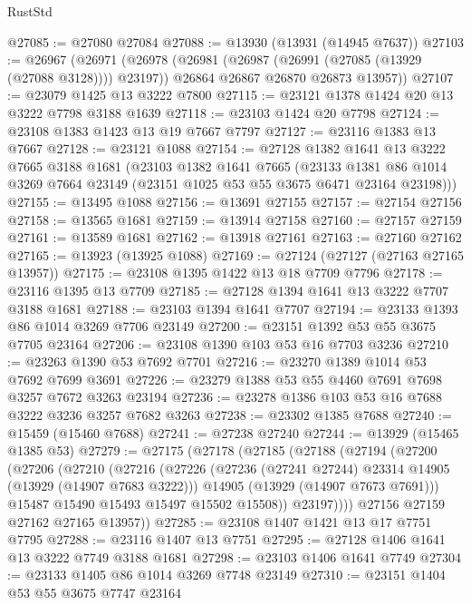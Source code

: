 \begin{lexlean}{RustStd}
\begin{coremodule}
@27085 := @27080 @27084
@27088 := @13930 (@13931 (@14945 @7637))
@27103 := @26967
    (@26971
      (@26978
        (@26981 (@26987 (@26991 (@27085 (@13929 (@27088 @3128)))) @23197))
        @26864
        @26867
        @26870
        @26873
        @13957))
@27107 := @23079 @1425 @13 @3222 @7800
@27115 := @23121 @1378 @1424 @20 @13 @3222 @7798 @3188 @1639
@27118 := @23103 @1424 @20 @7798
@27124 := @23108 @1383 @1423 @13 @19 @7667 @7797
@27127 := @23116 @1383 @13 @7667
@27128 := @23121 @1088
@27154 := @27128
    @1382
    @1641
    @13
    @3222
    @7665
    @3188
    @1681
    (@23103
      @1382
      @1641
      @7665
      (@23133 @1381 @86 @1014 @3269 @7664 @23149 (@23151 @1025 @53 @55 @3675 @6471 @23164 @23198)))
@27155 := @13495 @1088
@27156 := @13691 @27155
@27157 := @27154 @27156
@27158 := @13565 @1681
@27159 := @13914 @27158
@27160 := @27157 @27159
@27161 := @13589 @1681
@27162 := @13918 @27161
@27163 := @27160 @27162
@27165 := @13923 (@13925 @1088)
@27169 := @27124 (@27127 (@27163 @27165 @13957))
@27175 := @23108 @1395 @1422 @13 @18 @7709 @7796
@27178 := @23116 @1395 @13 @7709
@27185 := @27128 @1394 @1641 @13 @3222 @7707 @3188 @1681
@27188 := @23103 @1394 @1641 @7707
@27194 := @23133 @1393 @86 @1014 @3269 @7706 @23149
@27200 := @23151 @1392 @53 @55 @3675 @7705 @23164
@27206 := @23108 @1390 @103 @53 @16 @7703 @3236
@27210 := @23263 @1390 @53 @7692 @7701
@27216 := @23270 @1389 @1014 @53 @7692 @7699 @3691
@27226 := @23279 @1388 @53 @55 @4460 @7691 @7698 @3257 @7672 @3263 @23194
@27236 := @23278 @1386 @103 @53 @16 @7688 @3222 @3236 @3257 @7682 @3263
@27238 := @23302 @1385 @7688
@27240 := @15459 (@15460 @7688)
@27241 := @27238 @27240
@27244 := @13929 (@15465 @1385 @53)
@27279 := @27175
    (@27178
      (@27185
        (@27188
          (@27194
            (@27200
              (@27206
                (@27210
                  (@27216
                    (@27226
                      (@27236 (@27241 @27244) @23314 @14905 (@13929 (@14907 @7683 @3222)))
                      @14905
                      (@13929 (@14907 @7673 @7691)))
                    @15487
                    @15490
                    @15493
                    @15497
                    @15502
                    @15508))
                @23197))))
        @27156
        @27159
        @27162
        @27165
        @13957))
@27285 := @23108 @1407 @1421 @13 @17 @7751 @7795
@27288 := @23116 @1407 @13 @7751
@27295 := @27128 @1406 @1641 @13 @3222 @7749 @3188 @1681
@27298 := @23103 @1406 @1641 @7749
@27304 := @23133 @1405 @86 @1014 @3269 @7748 @23149
@27310 := @23151 @1404 @53 @55 @3675 @7747 @23164

\end{coremodule}
\end{lexlean}
